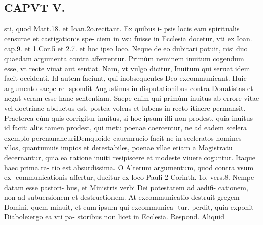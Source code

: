\documentclass{article}
\begin{document}
\begin{pages}
\section*{CAPVT  V. }
\marginpar{[ p.389 ]}\pstart sti, quod Matt.18. et Ioan.2o.recitant. Ex quibus i- psis locis eam spiritualis censurae et castigationis spe- ciem in vsu fuisse in Ecclesia docetur, vti ex Ioan. cap.9. et 1.Cor.5 et 2.7. et hoc ipso loco. Neque de eo dubitari potuit, nisi duo quaedam argumenta contra afferrentur. Primùm neminem inuitum cogendum esse, vt recte viuat aut sentiat. Nam, vt vulgo dicitur, Inuitum qui seruat idem facit occidenti. Id autem faciunt, qui inobsequentes Deo excommunicant. Huic argumento saepe re- spondit Augustinus in disputationibus contra Donatistas et negat veram esse hanc sententiam. Saepe enim qui primùm inuitus ab errore vitae vel doctrinae abductus est, postea volens et lubens in recto itinere permansit. Praeterea cùm quis corrigitur inuitus, si hoc ipsum illi non prodest, quia inuitus id facit: aliis tamen prodest, qui metu poenae coercentur, ne ad eadem scelera exemplo perenananeuriDemquoide cauemrucio facit ne in sceleratos homines vllos, quantumuis impios et derestabiles, poenae vllae etiam a Magistratu decernantur, quia ea ratione inuiti resipiscere et modeste viuere coguntur. Itaque haec prima ra- tio est absurdissima. O  \pend\pstart Alterum argumentum, quod contra vsum ex- communicationis affertur, ducitur ex loco Pauli 2 Corinth. 1o. vers.8. Nempe datam esse pastori- bus, et Ministris verbi Dei potestatem ad aedifi- cationem, non ad subuersionem et destructionem. At excommunicatio destruit gregem Domini, quem minuit, et eum ipsum qui excommunica- tur, perdit, quia exponit Diabole:ergo ea vti pa- storibus non licet in Ecclesia. Respond. Aliquid  \pend

\end{pages}
\end{document}
